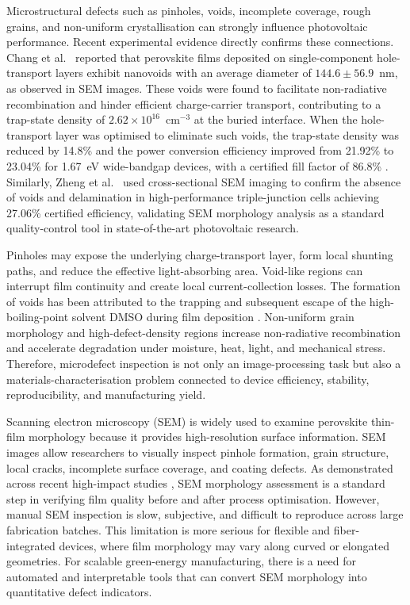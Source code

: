 \documentclass[pdflatex,sn-mathphys-num,iicol]{sn-jnl}
\theoremstyle{thmstyleone}
\theoremstyle{thmstyletwo}
\theoremstyle{thmstylethree}
\begin{document}
Microstructural defects such as pinholes, voids, incomplete coverage,
rough grains, and non-uniform crystallisation can strongly influence
photovoltaic performance. Recent experimental evidence directly
confirms these connections. Chang et al.\ \cite{chang2026} reported
that perovskite films deposited on single-component hole-transport
layers exhibit nanovoids with an average diameter of
$144.6 \pm 56.9$~nm, as observed in SEM images. These voids were
found to facilitate non-radiative recombination and hinder efficient
charge-carrier transport, contributing to a trap-state density of
$2.62 \times 10^{16}$~cm$^{-3}$ at the buried interface. When the
hole-transport layer was optimised to eliminate such voids, the
trap-state density was reduced by 14.8\% and the power conversion
efficiency improved from 21.92\% to 23.04\% for 1.67~eV wide-bandgap
devices, with a certified fill factor of 86.8\% \cite{chang2026}.
Similarly, Zheng et al.\ \cite{zheng2025} used cross-sectional SEM
imaging to confirm the absence of voids and delamination in
high-performance triple-junction cells achieving 27.06\% certified
efficiency, validating SEM morphology analysis as a standard
quality-control tool in state-of-the-art photovoltaic research.

Pinholes may expose the underlying charge-transport layer, form local
shunting paths, and reduce the effective light-absorbing area.
Void-like regions can interrupt film continuity and create local
current-collection losses. The formation of voids has been attributed
to the trapping and subsequent escape of the high-boiling-point
solvent DMSO during film deposition \cite{chang2026,chen2021}.
Non-uniform grain morphology and high-defect-density regions increase
non-radiative recombination and accelerate degradation under moisture,
heat, light, and mechanical stress. Therefore, microdefect inspection
is not only an image-processing task but also a
materials-characterisation problem connected to device efficiency,
stability, reproducibility, and manufacturing yield.

Scanning electron microscopy (SEM) is widely used to examine
perovskite thin-film morphology because it provides high-resolution
surface information. SEM images allow researchers to visually inspect
pinhole formation, grain structure, local cracks, incomplete surface
coverage, and coating defects. As demonstrated across recent
high-impact studies \cite{chang2026,zheng2025}, SEM morphology
assessment is a standard step in verifying film quality before and
after process optimisation. However, manual SEM inspection is slow,
subjective, and difficult to reproduce across large fabrication
batches. This limitation is more serious for flexible and
fiber-integrated devices, where film morphology may vary along curved
or elongated geometries. For scalable green-energy manufacturing,
there is a need for automated and interpretable tools that can convert
SEM morphology into quantitative defect indicators.
\end{document}

